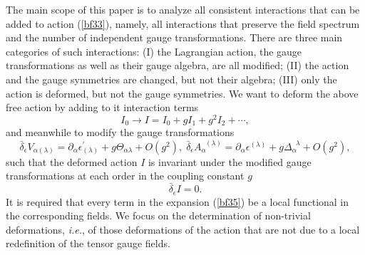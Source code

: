 \documentclass[a4paper,11pt]{article}
\begin{document}
The main scope of this paper is to analyze all consistent interactions that
can be added to action (\ref{bf33}), namely, all interactions that preserve
the field spectrum and the number of independent gauge transformations.
There are three main categories of such interactions: (I) the Lagrangian
action, the gauge transformations as well as their gauge algebra, are all
modified; (II) the action and the gauge symmetries are changed, but not
their algebra; (III) only the action is deformed, but not the gauge
symmetries. We want to deform the above free action by adding to it
interaction terms
\begin{equation}
I_{0}\rightarrow I=I_{0}+gI_{1}+g^{2}I_{2}+\cdots ,  \label{bf35}
\end{equation}
and meanwhile to modify the gauge transformations
\begin{equation}
\bar{\delta}_{\epsilon }V_{\alpha (\lambda )}=\partial _{\alpha }\epsilon
_{(\lambda )}^{\prime }+g\Theta _{\alpha \lambda }+O\left( g^{2}\right) ,\;%
\bar{\delta}_{\epsilon }A_{\alpha }^{\;\;(\lambda )}=\partial _{\alpha
}\epsilon ^{(\lambda )}+g\Delta _{\alpha }^{\;\;\lambda }+O\left(
g^{2}\right) ,  \label{bf36}
\end{equation}
such that the deformed action $I$ is invariant under the modified gauge
transformations at each order in the coupling constant $g$%
\begin{equation}
\bar{\delta}_{\epsilon }I=0.  \label{bf37}
\end{equation}
It is required that every term in the expansion (\ref{bf35}) be a local
functional in the corresponding fields. We focus on the determination of
non-trivial deformations, \textit{i.e.}, of those deformations of the action
that are not due to a local redefinition of the tensor gauge fields.
\end{document}

